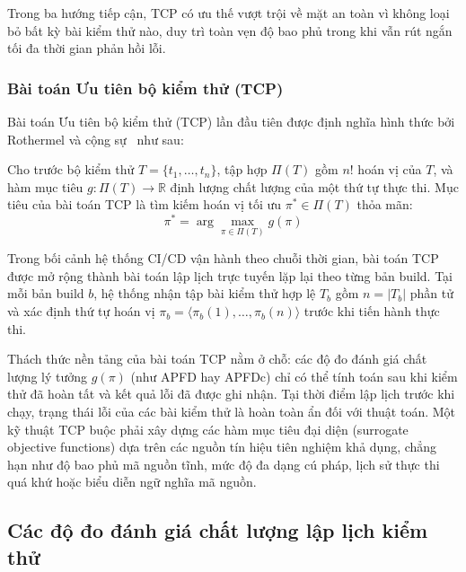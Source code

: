Trong ba hướng tiếp cận, TCP có ưu thế vượt trội về mặt an toàn vì không loại bỏ bất kỳ bài kiểm thử nào, duy trì toàn vẹn độ bao phủ trong khi vẫn rút ngắn tối đa thời gian phản hồi lỗi.

\subsubsection{Bài toán Ưu tiên bộ kiểm thử (TCP)}
\label{subsubsec:tcp_formal_problem}

Bài toán Ưu tiên bộ kiểm thử (TCP) lần đầu tiên được định nghĩa hình thức bởi Rothermel và cộng sự~\cite{rothermel1999tcp, elbaum2002tcp} như sau:

\begin{dn}
\label{def:tcp_problem}
Cho trước bộ kiểm thử $T = \{t_1, \dots, t_n\}$, tập hợp $\Pi(T)$ gồm $n!$ hoán vị của $T$, và hàm mục tiêu $g: \Pi(T) \to \mathbb{R}$ định lượng chất lượng của một thứ tự thực thi. Mục tiêu của bài toán TCP là tìm kiếm hoán vị tối ưu $\pi^* \in \Pi(T)$ thỏa mãn:
\begin{equation}
\label{eq:tcp_general}
\pi^* = \arg\max_{\pi \in \Pi(T)} g(\pi)
\end{equation}
\end{dn}

Trong bối cảnh hệ thống CI/CD vận hành theo chuỗi thời gian, bài toán TCP được mở rộng thành bài toán lập lịch trực tuyến lặp lại theo từng bản build. Tại mỗi bản build $b$, hệ thống nhận tập bài kiểm thử hợp lệ $T_b$ gồm $n = |T_b|$ phần tử và xác định thứ tự hoán vị $\pi_b = \langle \pi_b(1), \dots, \pi_b(n) \rangle$ trước khi tiến hành thực thi.

Thách thức nền tảng của bài toán TCP nằm ở chỗ: các độ đo đánh giá chất lượng lý tưởng $g(\pi)$ (như APFD hay APFDc) chỉ có thể tính toán sau khi kiểm thử đã hoàn tất và kết quả lỗi đã được ghi nhận. Tại thời điểm lập lịch trước khi chạy, trạng thái lỗi của các bài kiểm thử là hoàn toàn ẩn đối với thuật toán. Một kỹ thuật TCP buộc phải xây dựng các hàm mục tiêu đại diện (surrogate objective functions) dựa trên các nguồn tín hiệu tiên nghiệm khả dụng, chẳng hạn như độ bao phủ mã nguồn tĩnh, mức độ đa dạng cú pháp, lịch sử thực thi quá khứ hoặc biểu diễn ngữ nghĩa mã nguồn.

\subsection{Các độ đo đánh giá chất lượng lập lịch kiểm thử}
\label{subsec:tcp_metrics}

